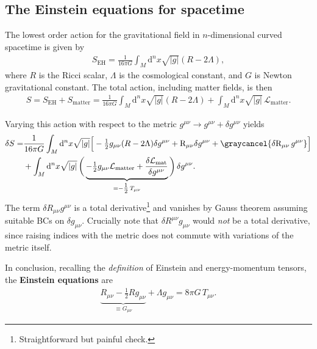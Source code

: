 \subsection{The Einstein equations for spacetime}


\begin{mytheorem}
The lowest order action for the gravitational field in $n$-dimensional curved spacetime is given by
\begin{align}\label{eq:einstein_hilbert_action}
    S_{\mathrm{EH}} = \frac{1}{16\pi G} \int_M \mathrm{d}^n x \sqrt{|g|} (R - 2\Lambda),
\end{align}
where $R$ is the Ricci scalar, $\Lambda$ is the cosmological constant, and $G$ is Newton gravitational constant.
The total action, including matter fields, is then
\begin{align}
    S = S_{\mathrm{EH}} + S_{\mathrm{matter}} = \frac{1}{16\pi G} \int_M \mathrm{d}^n x \sqrt{|g|} (R - 2\Lambda) + \int_M \mathrm{d}^n x \sqrt{|g|} \, \mathcal{L}_{\mathrm{matter}}.
\end{align}

Varying this action with respect to the metric $g^{\mu\nu} \to g^{\mu\nu} + \delta g^{\mu\nu}$ yields 
\begin{align}
    \delta S =& \frac{1}{16\pi G} \int_M \mathrm{d}^n x \sqrt{|g|} \Big[-\tfrac{1}{2}g_{\mu\nu}(R-2\Lambda) \delta g^{\mu\nu}+ \mathrm{R}_{\mu\nu} \delta g^{\mu\nu} +  \graycancel{\delta\mathrm{R}_{\mu\nu}\, g^{\mu\nu}}\Big] 
    \\
    &+ \int_M \mathrm{d}^n x \sqrt{|g|}\,\bigg(\underbrace{-\tfrac{1}{2} g_{\mu\nu}\mathcal{L}_{\mathrm{matter}}+ \frac{\delta \mathcal{L}_{\mathrm{mat}}}{\delta g^{\mu\nu}}}_{= -\tfrac{1}{2}\, T_{\mu\nu}}\bigg)\, \delta g^{\mu\nu}.
\end{align}
The term $\delta R_{\mu\nu} g^{\mu\nu}$ is a total derivative\footnote{Straightforward but painful check.} and vanishes by Gauss theorem assuming suitable BCs on $\delta g_{\mu\nu}$.
Crucially note that $\delta R^{\mu\nu} g_{\mu\nu}$ would \emph{not} be a total derivative, since raising indices with the metric does not commute with variations of the metric itself.

In conclusion, recalling the \emph{definition} of Einstein and energy-momentum tensors, the \textbf{Einstein equations} are
\begin{align}
    \underbrace{R_{\mu\nu} - \tfrac{1}{2} R g_{\mu\nu}}_{\equiv G_{\mu\nu}} + \Lambda g_{\mu\nu} = 8\pi G\, T_{\mu\nu}.
\end{align}
%
\end{mytheorem}



